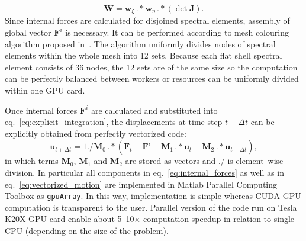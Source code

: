 \documentclass[preprint,12pt]{elsarticle}
\renewcommand{\vec}[1]{\mathbf{#1}}
\begin{document}
	\begin{equation}
	\vec{W} = \vec{w}_{\xi}\,.*\vec{w}_{\eta}\,.*\left(\det\vec{J}\right).
	\end{equation}
	Since internal forces are calculated for disjoined spectral elements, assembly of global vector $\vec{F}^i$ is necessary. It can be performed according to mesh colouring algorithm proposed in~\cite{Kudela2016}. The algorithm uniformly divides nodes of spectral elements within the whole mesh into 12 sets. Because each flat shell spectral element consists of 36 nodes, the 12 sets are of the same size so the computation can be perfectly balanced between workers or resources can be uniformly divided within one GPU card.
	
	Once internal forces $\vec{F}^i$ are calculated and substituted into eq.~\ref{eq:explicit_integration}, the displacements at time step $t+\Delta t$ can be explicitly obtained from perfectly vectorized code:
	\begin{equation}
	\vec{u}_{t+\Delta t}=1./\vec{M}_0\, .*\left(\vec{F}_t - \vec{F}^i +\vec{M}_1 \, .* \vec{u}_t +\vec{M}_2 \, .* \vec{u}_{t-\Delta t}\right),
	\label{eq:vectorized_motion}
	\end{equation} 
	in which terms $\vec{M}_0$, $\vec{M}_1$ and $\vec{M}_2$ are stored as vectors and $./$ is element--wise division. In particular all components in eq.~\ref{eq:internal_forces} as well as in eq.~\ref{eq:vectorized_motion} are implemented in Matlab Parallel Computing Toolbox as \verb|gpuArray|. In this way, implementation is simple whereas CUDA GPU computation is transparent to the user. Parallel version of the code run on Tesla K20X GPU card enable about 5--10$\times$ computation speedup in relation to single CPU (depending on the size of the problem). 
\end{document}

